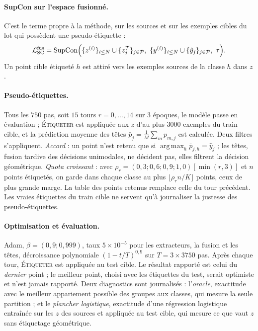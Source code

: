 \documentclass[11pt,a4paper]{article}
\theoremstyle{definition}
\theoremstyle{remark}
\DeclareMathOperator*{\argmax}{arg\,max}
\DeclareMathOperator{\SupCon}{SupCon}
\newcommand{\Tgt}{\mathcal{T}}
\newcommand{\Loss}{\mathcal{L}}
\newcommand{\Pcal}{\mathcal{P}}
\begin{document}
\paragraph{SupCon sur l'espace fusionné.} C'est le terme propre à la méthode, sur les sources et sur les exemples cibles
du lot qui possèdent une pseudo-étiquette :
\begin{equation}\label{eq-scfus}
  \Loss^{\text{fus}}_{\text{SC}} = \SupCon\Bigl(\{z^{(i)}\}_{i \le N} \cup \{z^{\Tgt}_j\}_{j \in \Pcal},\
  \{y^{(i)}\}_{i \le N} \cup \{\hat y_j\}_{j \in \Pcal},\ \tau\Bigr).
\end{equation}
Un point cible étiqueté $h$ est attiré vers les exemples sources de la classe $h$ dans $z$.

\paragraph{Pseudo-étiquettes.} Tous les $750$ pas, soit $15$ tours $r = 0, \dots, 14$ sur $3$ époques, le modèle passe
en évaluation ; \textsc{Étiqueter} est appliquée aux $z$ d'au plus $3000$ exemples du train cible, et la prédiction
moyenne des têtes $\bar p_j = \frac1M \sum_m p_{m, j}$ est calculée. Deux filtres s'appliquent. \emph{Accord} : un point
n'est retenu que si $\argmax_h \bar p_{j, h} = \hat y_j$ ; les têtes, fusion tardive des décisions unimodales, ne
décident pas, elles filtrent la décision géométrique. \emph{Quota croissant} : avec
$\rho_r = (0{,}3 ; 0{,}6 ; 0{,}9 ; 1{,}0)[\min(r, 3)]$ et $n$ points étiquetés, on garde dans chaque classe au plus
$\lfloor \rho_r n / K \rfloor$ points, ceux de plus grande marge. La table des points retenus remplace celle du tour
précédent. Les vraies étiquettes du train cible ne servent qu'à journaliser la justesse des pseudo-étiquettes.

\paragraph{Optimisation et évaluation.} Adam, $\beta = (0{,}9 ; 0{,}999)$, taux $5 \times 10^{-5}$ pour les extracteurs,
la fusion et les têtes, décroissance polynomiale $(1 - t/T)^{0{,}9}$ sur $T = 3 \times 3750$ pas. Après chaque tour,
\textsc{Étiqueter} est appliquée au test cible. Le résultat rapporté est celui du \emph{dernier} point ; le meilleur
point, choisi avec les étiquettes du test, serait optimiste et n'est jamais rapporté. Deux diagnostics sont journalisés :
l'\emph{oracle}, exactitude avec le meilleur appariement possible des groupes aux classes, qui mesure la seule
partition ; et le \emph{plancher logistique}, exactitude d'une régression logistique entraînée sur les $z$ des sources
et appliquée au test cible, qui mesure ce que vaut $z$ sans étiquetage géométrique.
\end{document}
